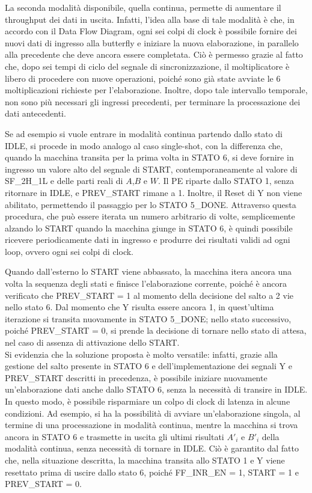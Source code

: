\vspace{0.5cm}

\noindent La seconda modalità disponibile, quella continua, permette di aumentare il throughput dei dati in uscita. Infatti, l'idea alla base di tale modalità è che, in accordo con il Data Flow Diagram, ogni sei colpi di clock è possibile fornire dei nuovi dati di ingresso alla butterfly e iniziare la nuova elaborazione, in parallelo alla precedente che deve ancora essere completata. Ciò è permesso grazie al fatto che, dopo sei tempi di ciclo del segnale di sincronizzazione, il moltiplicatore è libero di procedere con nuove operazioni, poiché sono già state avviate le 6 moltiplicazioni richieste per l'elaborazione. Inoltre, dopo tale intervallo temporale, non sono più necessari gli ingressi precedenti, per terminare la processazione dei dati antecedenti. 

\noindent Se ad esempio si vuole entrare in modalità continua partendo dallo stato di IDLE, si procede in modo analogo al caso single-shot, con la differenza che, quando la macchina transita per la prima volta in STATO 6, si deve fornire in ingresso un valore alto del segnale di START, contemporaneamente al valore di SF\_2H\_1L e delle parti reali di $A$,$B$ e $W$. Il PE riparte dallo STATO 1, senza ritornare in IDLE, e PREV\_START rimane a 1. Inoltre, il Reset di Y non viene abilitato, permettendo il passaggio per lo STATO 5\_DONE. Attraverso questa procedura, che può essere iterata un numero arbitrario di volte, semplicemente alzando lo START quando la macchina giunge in STATO 6, è quindi possibile ricevere periodicamente dati in ingresso e produrre dei risultati validi ad ogni loop, ovvero ogni sei colpi di clock.

\noindent Quando dall'esterno lo START viene abbassato, la macchina itera ancora una volta la sequenza degli stati e finisce l'elaborazione corrente, poiché è ancora verificato che PREV\_START = 1 al momento della decisione del salto a 2 vie nello stato 6. Dal momento che Y risulta essere ancora 1, in quest'ultima iterazione si transita nuovamente in STATO 5\_DONE; nello stato successivo, poiché PREV\_START = 0, si prende la decisione di tornare nello stato di attesa, nel caso di assenza di attivazione dello START. \\

\noindent Si evidenzia che la soluzione proposta è molto versatile: infatti, grazie alla gestione del salto presente in STATO 6 e dell'implementazione dei segnali Y e PREV\_START descritti in precedenza, è possibile iniziare nuovamente un'elaborazione dati anche dallo STATO 6, senza la necessità di transire in IDLE. In questo modo, è possibile risparmiare un colpo di clock di latenza in alcune condizioni. Ad esempio, si ha la possibilità di avviare un'elaborazione singola, al termine di una processazione in modalità continua, mentre la macchina si trova ancora in STATO 6 e trasmette in uscita gli ultimi risultati $A'_i$ e $B'_i$ della modalità continua, senza necessità di tornare in IDLE. Ciò è garantito dal fatto che, nella situazione descritta, la macchina transita allo STATO 1 e Y viene resettato prima di uscire dallo stato 6, poiché FF\_INR\_EN  = 1, START = 1 e PREV\_START = 0.

